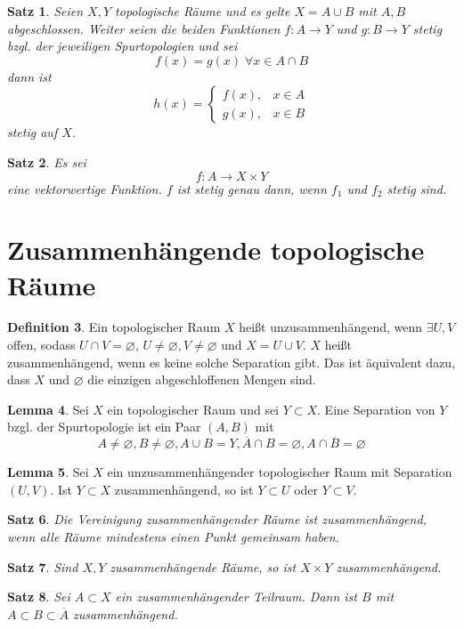 \documentclass[a4paper, 12pt]{article}
\theoremstyle{plain}
\newtheorem{theorem}{Satz}[section] %
\theoremstyle{definition}
\newtheorem{definition}[theorem]{Definition} %
\theoremstyle{lemma}
\newtheorem{lemma}[theorem]{Lemma}
\theoremstyle{remark}
\theoremstyle{corollary}
\theoremstyle{example}
\begin{document}
	\begin{theorem}
		Seien $X,Y$ topologische Räume und es gelte $X = A\cup B$ mit $A,B$ abgeschlossen. Weiter seien die beiden Funktionen $f:A\to Y$ und $g:B \to Y$ stetig bzgl. der jeweiligen Spurtopologien und sei \[f(x) = g(x) \; \forall x \in A \cap B\] dann ist \[h(x) = \begin{cases}
			f(x), & x \in A\\
			g(x), & x \in B
		\end{cases}\] stetig auf $X$.
	\end{theorem}
	\begin{theorem}
		Es sei \[f:A \to X\times Y\] eine vektorwertige Funktion. $f$ ist stetig genau dann, wenn $f_1$ und $f_2$ stetig sind.
	\end{theorem}
	\section{Zusammenhängende topologische Räume}
	\begin{definition}
		Ein topologischer Raum $X$ heißt unzusammenhängend, wenn $\exists U,V$ offen, sodass $U\cap V = \varnothing$, $U \neq \varnothing, V \neq \varnothing$ und $X = U\cup V$. $X$ heißt zusammenhängend, wenn es keine solche Separation gibt. Das ist äquivalent dazu, dass $X$ und $\varnothing$ die einzigen abgeschloffenen Mengen sind.
	\end{definition}
	\begin{lemma}
		Sei $X$ ein topologischer Raum und sei $Y\subset X$. Eine Separation von $Y$ bzgl. der Spurtopologie ist ein Paar $(A,B)$ mit \[A\neq \varnothing, B \neq \varnothing, A\cup B = Y, \overline{A}\cap B = \varnothing, A \cap \overline{B} = \varnothing\]
	\end{lemma}
	\begin{lemma}
		Sei $X$ ein unzusammenhängender topologischer Raum mit Separation $(U,V)$. Ist $Y\subset X$ zusammenhängend, so ist $Y\subset U$ oder $Y\subset V$. 
	\end{lemma}
	\begin{theorem}
		Die Vereinigung zusammenhängender Räume ist zusammenhängend, wenn alle Räume mindestens einen Punkt gemeinsam haben.
	\end{theorem}
	\begin{theorem}
		Sind $X,Y$ zusammenhängende Räume, so ist $X\times Y$ zusammenhängend.
	\end{theorem}
	\begin{theorem}
		Sei $A\subset X$ ein zusammenhängender Teilraum. Dann ist $B$ mit $A\subset B \subset \overline{A}$ zusammenhängend.
	\end{theorem}
\end{document}
